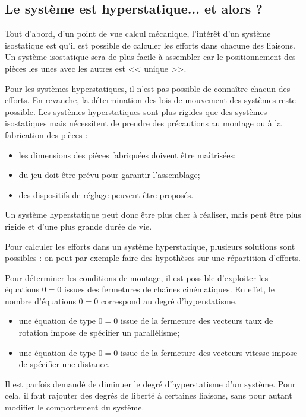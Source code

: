 \documentclass[10pt,fleqn]{article} %
\begin{document}
\subsection{Le système est hyperstatique... et alors ?}

Tout d'abord, d'un point de vue calcul mécanique, l'intérêt d'un système isostatique est qu'il est possible de calculer les efforts dans chacune des liaisons. Un système isostatique sera de plus facile à assembler car le positionnement des pièces les unes avec les autres est << unique >>. 

Pour les systèmes hyperstatiques, il n'est pas possible de connaître chacun des efforts. En revanche, la détermination des lois de mouvement des systèmes reste possible. Les systèmes hyperstatiques sont plus rigides que des systèmes isostatiques mais nécessitent de prendre des précautions au montage ou à la fabrication des pièces : 
\begin{itemize}
 \item les dimensions des pièces fabriquées doivent être maîtrisées;
 \item du jeu doit être prévu pour garantir l'assemblage;
 \item des dispositifs de réglage peuvent être proposés.
\end{itemize}

Un système hyperstatique peut donc être plus cher à réaliser, mais peut être plus rigide et d'une plus grande durée de vie. 

Pour calculer les efforts dans un système hyperstatique, plusieurs solutions sont possibles : on peut par exemple faire des hypothèses sur une répartition d'efforts. 


\begin{methode}
Pour déterminer les conditions de montage, il est possible d'exploiter les équations $0=0$ issues des fermetures de chaînes cinématiques.  En effet, le nombre d'équations $0=0$ correspond  au degré d'hyperstatisme.
\begin{itemize}
\item une équation de type $0=0$ issue de la fermeture des vecteurs taux de rotation impose de spécifier un parallélisme;
\item une équation de type $0=0$ issue de la fermeture des vecteurs vitesse impose de spécifier une distance.
\end{itemize}
\end{methode}

Il est parfois demandé de diminuer le degré d'hyperstatisme d'un système. Pour cela, il faut rajouter des degrés de liberté à certaines liaisons, sans pour autant modifier le comportement du système.
\end{document}
